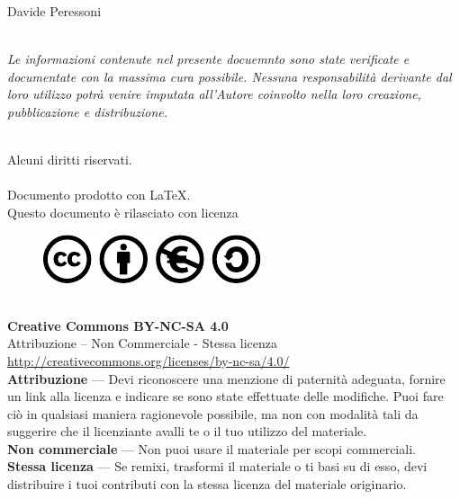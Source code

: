  Davide Peressoni\\~\par
    \emph{Le informazioni contenute nel presente docuemnto sono state verificate e documentate con la massima cura possibile. Nessuna responsabilità derivante dal loro utilizzo potrà venire imputata all’Autore coinvolto nella loro creazione, pubblicazione e distribuzione.}\\~\par
    Alcuni diritti riservati.\\~\\
    Documento prodotto con \LaTeX.\\
    Questo documento è rilasciato con licenza\\
    \begin{figure}[!ht]
	\centering
	    \includegraphics{CC.pdf}
    \end{figure}~\\
    \textbf{Creative Commons BY-NC-SA 4.0}\\
    Attribuzione – Non Commerciale - Stessa licenza\\
    \url{http://creativecommons.org/licenses/by-nc-sa/4.0/}\\
    \textbf{Attribuzione} — Devi riconoscere una menzione di paternità adeguata, fornire un link alla licenza e indicare se sono state effettuate delle modifiche. Puoi
    fare ciò in qualsiasi maniera ragionevole possibile, ma non con modalità tali da suggerire che il licenziante avalli te o il tuo utilizzo del materiale.\\
    \textbf{Non commerciale} — Non puoi usare il materiale per scopi commerciali.\\
    \textbf{Stessa licenza} — Se remixi, trasformi il materiale o ti basi su di esso, devi distribuire i tuoi contributi con la stessa licenza del materiale originario.
